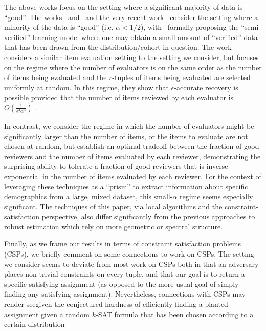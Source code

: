 \documentclass[final,12pt]{colt2018}
\newcommand{\eps}{\epsilon}
\begin{document}
The above works focus on the setting where a significant majority of data is ``good''.  The works~\citep{steinhardt2016avoiding} and~\citep{CSV17} and the very recent work~\citep{diakonikolas2017list} consider the setting where a minority of the data is ``good'' (i.e. $\alpha < 1/2$), with~\citep{CSV17} formally proposing the ``semi-verified'' learning model where one may obtain a small amount of ``verified'' data that has been drawn from the distribution/cohort in question.  The work~\citep{steinhardt2016avoiding} considers a similar item evaluation setting to the setting we consider, but focuses on the regime where the number of evaluators is on the same order as the number of items being evaluated and the $r$-tuples of items being evaluated are selected uniformly at random.  In this regime, they show that $\eps$-accurate recovery is possible provided that the number of items reviewed by each evaluator is $O(\frac{1}{\eps^4\alpha^3})$ .  

In contrast, we consider the regime in which the number of evaluators might be significantly larger than the number of items, or the items to evaluate are not chosen at random, but establish an optimal tradeoff between the fraction of good reviewers and the number of items evaluated by each reviewer, demonstrating the surprising ability to tolerate a fraction of good reviewers that is inverse exponential in the number of items evaluated by each reviewer.   For the context of leveraging these techniques as a ``prism'' to extract information about specific demographics from a large, mixed dataset, this small-$\alpha$ regime seems especially significant.   The techniques of this paper, via local algorithms and the constraint-satisfaction perspective, also differ significantly from the previous approaches  to robust estimation which rely on more geometric or spectral structure.
  

\iffalse
Finally, as we frame our results in terms of constraint satisfaction problems (CSPs), we briefly comment on some connections to work on CSPs.   The setting we consider seems to deviate from most work on CSPs both in that an adversary places non-trivial constraints on every tuple, and that our goal is to return a specific satisfying assignment (as opposed to the more usual goal of simply finding any satisfying assignment).  Nevertheless, connections with CSPs may render  seegiven the conjectured hardness of efficiently finding a planted assignment given a random $k$-SAT formula that has been chosen according to a certain distribution  
\end{document}
